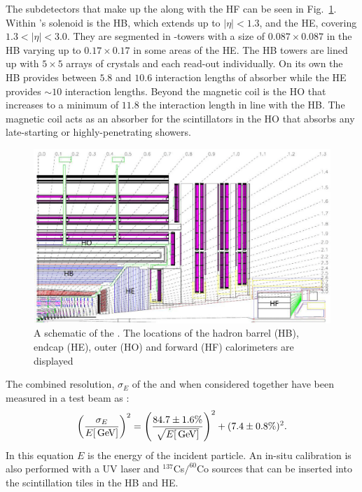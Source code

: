 The subdetectors that make up the \HCAL along with the \ac{HF} can be
seen in Fig.~\ref{fig:hcal}. Within \CMS's solenoid is the \ac{HB},
which extends up to $|\eta|<1.3$, and the \ac{HE}, covering
$1.3<|\eta|<3.0$. They are segmented in \eta-\phi towers with a size
of $0.087\times0.087$ in the \ac{HB} varying up to $0.17\times0.17$ in
some areas of the \ac{HE}. The \ac{HB} towers are lined up with
$5\times5$ arrays of \ECAL crystals and each read-out individually. On
its own the \ac{HB} provides between $5.8$ and $10.6$ interaction
lengths of absorber while the \ac{HE} provides $\sim10$ interaction
lengths. Beyond the magnetic coil is the \ac{HO} that increases to a
minimum of $11.8$ the interaction length in line with the \ac{HB}. The
magnetic coil acts as an absorber for the scintillators in the \ac{HO}
that absorbs any late-starting or highly-penetrating showers.

\begin{figure}
\begin{center}
\includegraphics[width=0.8\linewidth]{figs/cms_HCAL} \end{center}
\caption{ A schematic of the \CMS \HCAL. The locations of the hadron
barrel (HB), endcap (HE), outer (HO) and forward (HF) calorimeters are
displayed \cite{Chatrchyan:2008aa}}
\label{fig:hcal} \end{figure}

The combined resolution, $\sigma_E$ of the \ECAL and \HCAL when
considered together have been measured in a test beam as
\cite{Abdullin:2008zzb}: 
\begin{equation} \label{eq:hcalres}
\left(\frac{\sigma_E}{E[\mathrm{\,Ge\kern -0.1em V}]}\right)^2=\left(\frac{84.7\pm1.6\%}
{\sqrt{E[\mathrm{\,Ge\kern -0.1em V}]}}\right)^2+(7.4\pm0.8\%)^2.  
\end{equation} 
In this equation $E$ is the energy of the incident particle. An
in-situ calibration is also performed with a UV laser and
$^137$Cs$/^60$Co sources that can be inserted into the scintillation
tiles in the \ac{HB} and \ac{HE}.

